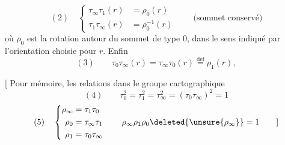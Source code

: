 \[
 (2)\quad
 \left\{\begin{aligned}
 \tau_\infty\tau_1(r)&=\rho_0(r)\\
 \tau_1\tau_\infty(r)&=\rho_0^{-1}(r)
 \end{aligned}\right.
 \qquad\text{(sommet conservé)}
\]
où $\rho_0$ est la rotation  autour du sommet de type $0$, dans le sens indiqué par l'orientation choisie pour $r$. Enfin
\[
 (3)\qquad\tau_0\tau_\infty(r)=\tau_\infty\tau_0(r)\overset{\mathrm{def}}=\rho_1(r),
\]

[ Pour mémoire, les relations dans le groupe cartographique
\[
 (4)\qquad\tau_0^2=\tau_1^2=\tau_\infty^2=(\tau_0\tau_\infty)^2=1
\]
\[
 (5)\quad
 \left\{\begin{aligned}
 \rho_\infty&=\tau_1\tau_0\\
 \rho_0&=\tau_\infty\tau_1\\
 \rho_1&=\tau_0\tau_\infty
 \end{aligned}\right.
 \qquad\rho_\infty\rho_1\rho_0\deleted{\unsure{\rho_\infty}}=1
 \qquad\text{]}
\]
